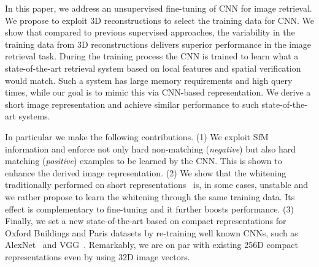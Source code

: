 In this paper, we address an unsupervised fine-tuning of CNN for image retrieval. 
We propose to exploit 3D reconstructions to select the training data for CNN. We show that compared to previous supervised approaches, the variability in the training data from 3D reconstructions delivers superior performance in the image retrieval task. 
During the training process the CNN is trained to learn what a state-of-the-art retrieval system based on local features and spatial verification would match. 
Such a system  has large memory requirements and high query times, while our goal is to mimic this via CNN-based representation.
We derive a short image representation and achieve similar performance to such state-of-the-art systems.

In particular we make the following contributions.
(1) We exploit SfM information and enforce not only hard non-matching (\emph{negative}) but also hard matching (\emph{positive}) examples to be learned by the CNN. This is shown to enhance the derived image representation.
(2) We show that the whitening traditionally performed on short representations~\cite{JC12} is, in some cases, unstable and we rather propose to learn the whitening through the same training data. Its effect is complementary to fine-tuning and it further boosts performance. 
(3) Finally, we set a new state-of-the-art based on compact representations for Oxford Buildings and Paris datasets by re-training well known CNNs, such as AlexNet~\cite{KSH12} and VGG~\cite{SZ14}.
Remarkably, we are on par with existing 256D compact representations even by using 32D image vectors.

